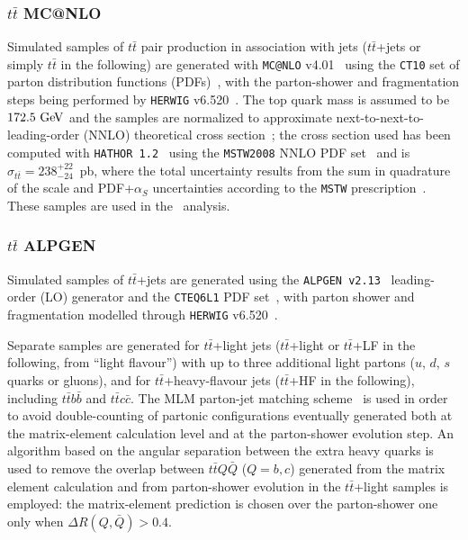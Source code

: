 \subsubsection{$t\bar{t}$ MC@NLO}\label{subsec:MC@NLO}
Simulated samples of $t\bar{t}$ pair production  in association with jets 
($t\bar{t}$+jets or simply $t\bar{t}$ in the following)
are generated with {\tt MC@NLO} v4.01~\cite{mcatnlo_1,mcatnlo_2,mcatnlo_3} using the {\tt CT10} set of parton distribution functions (PDFs)~\cite{ct10},
with the parton-shower and fragmentation steps being performed by 
{\tt HERWIG} v6.520~\cite{HERWIG}.
The top quark mass is assumed to be  $172.5\gev$ and 
the samples are normalized to approximate next-to-next-to-leading-order 
(NNLO) theoretical cross section~\cite{ttbarxs}; the cross section used 
has been computed with {\tt HATHOR 1.2}~\cite{ttbarxs} using the {\tt MSTW2008}
NNLO PDF set~\cite{Martin:2009iq} and is $\sigma_{t\bar{t}}= 238^{+22}_{-24}$~pb, 
where the total uncertainty results from the sum in quadrature of the 
scale and PDF+$\alpha_S$ uncertainties according to 
the {\tt MSTW} prescription~\cite{mstw2}. 
These samples are used in the \wbx\ analysis.

\subsubsection{$t\bar{t}$ ALPGEN}\label{subsec:alpgen}
Simulated samples of $t\bar{t}$+jets are generated using
the {\tt ALPGEN v2.13}~\cite{ALPGEN} leading-order (LO) generator and the 
{\tt CTEQ6L1} PDF set~\cite{cteq6}, with parton shower and fragmentation  
modelled through {\tt HERWIG} v6.520~\cite{HERWIG}.

Separate samples are generated for $t\bar{t}$+light jets ($t\bar{t}$+light 
or $t\bar{t}$+LF in the following, from ``light flavour'') 
with up to three additional light partons ($u$, $d$, $s$ quarks or gluons),
and for $t\bar{t}$+heavy-flavour jets ($t\bar{t}$+HF in the following), 
including $t\bar{t}b\bar{b}$ and
$t\bar{t}c\bar{c}$.  
The MLM parton-jet matching scheme~\cite{mlm} is used
in order to avoid double-counting  of partonic configurations
eventually generated both at the matrix-element calculation level
and at the parton-shower evolution step.
An algorithm based on the angular separation
between the extra heavy quarks is used to remove 
the overlap between $t\bar{t}Q\bar{Q}$ ($Q=b,c$) 
generated from the matrix element calculation and 
from parton-shower evolution in the  $t\bar{t}$+light samples
is employed: the matrix-element prediction is chosen over the parton-shower one
only when $\Delta R(Q,\bar{Q})>0.4$.

